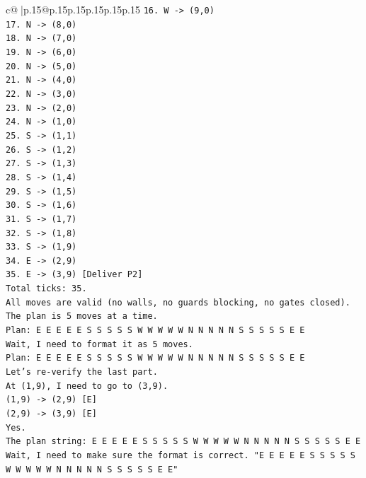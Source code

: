 \documentclass{article}
\begin{document}
{\begin{supertabular}{c@{$\;$}|p{.15\linewidth}@{}p{.15\linewidth}p{.15\linewidth}p{.15\linewidth}p{.15\linewidth}p{.15\linewidth}}
{{{\texttt{16. W {-}> (9,0)} \\
\texttt{17. N {-}> (8,0)} \\
\texttt{18. N {-}> (7,0)} \\
\texttt{19. N {-}> (6,0)} \\
\texttt{20. N {-}> (5,0)} \\
\texttt{21. N {-}> (4,0)} \\
\texttt{22. N {-}> (3,0)} \\
\texttt{23. N {-}> (2,0)} \\
\texttt{24. N {-}> (1,0)} \\
\texttt{25. S {-}> (1,1)} \\
\texttt{26. S {-}> (1,2)} \\
\texttt{27. S {-}> (1,3)} \\
\texttt{28. S {-}> (1,4)} \\
\texttt{29. S {-}> (1,5)} \\
\texttt{30. S {-}> (1,6)} \\
\texttt{31. S {-}> (1,7)} \\
\texttt{32. S {-}> (1,8)} \\
\texttt{33. S {-}> (1,9)} \\
\texttt{34. E {-}> (2,9)} \\
\texttt{35. E {-}> (3,9) {[}Deliver P2{]}} \\
\texttt{Total ticks: 35.} \\
\texttt{All moves are valid (no walls, no guards blocking, no gates closed).} \\
\texttt{The plan is 5 moves at a time.} \\
\texttt{Plan: E E E E E S S S S S W W W W W N N N N N S S S S S E E} \\
\texttt{Wait, I need to format it as 5 moves.} \\
\texttt{Plan: E E E E E S S S S S W W W W W N N N N N S S S S S E E} \\
\texttt{Let's re{-}verify the last part.} \\
\texttt{At (1,9), I need to go to (3,9).} \\
\texttt{(1,9) {-}> (2,9) {[}E{]}} \\
\texttt{(2,9) {-}> (3,9) {[}E{]}} \\
\texttt{Yes.} \\
\texttt{The plan string: E E E E E S S S S S W W W W W N N N N N S S S S S E E} \\
\texttt{Wait, I need to make sure the format is correct. "E E E E E S S S S S W W W W W N N N N N S S S S S E E"} \\
}}}
\end{supertabular}}
\end{document}

